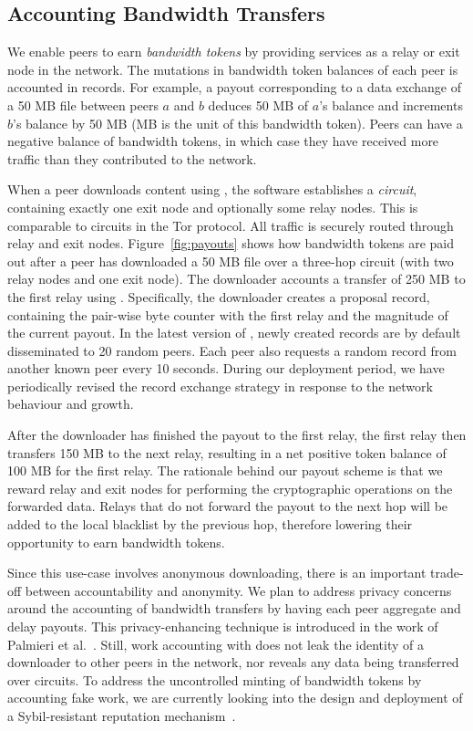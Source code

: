 \subsection{Accounting Bandwidth Transfers}
We enable peers to earn \emph{bandwidth tokens} by providing services as a relay or exit node in the \Tribler{} network.
The mutations in bandwidth token balances of each peer is accounted in \TrustChain{} records.
For example, a payout corresponding to a data exchange of a 50 MB file between peers $ a $ and $ b $ deduces 50 MB of $ a $'s balance and increments $ b $'s balance by 50 MB (MB is the unit of this bandwidth token).
Peers can have a negative balance of bandwidth tokens, in which case they have received more traffic than they contributed to the network.

When a peer downloads content using \Tribler{}, the \Tribler{} software establishes a \emph{circuit}, containing exactly one exit node and optionally some relay nodes.
This is comparable to circuits in the Tor protocol.
All traffic is securely routed through relay and exit nodes.
Figure~\ref{fig:payouts} shows how bandwidth tokens are paid out after a peer has downloaded a 50 MB file over a three-hop circuit (with two relay nodes and one exit node).
The downloader accounts a transfer of 250 MB to the first relay using \TrustChain{}.
Specifically, the downloader creates a proposal record, containing the pair-wise byte counter with the first relay and the magnitude of the current payout.
In the latest version of \Tribler{}, newly created records are by default disseminated to 20 random peers.
Each peer also requests a random record from another known peer every 10 seconds.
During our deployment period, we have periodically revised the record exchange strategy in response to the network behaviour and growth.

After the downloader has finished the payout to the first relay, the first relay then transfers 150 MB to the next relay, resulting in a net positive token balance of 100 MB for the first relay.
The rationale behind our payout scheme is that we reward relay and exit nodes for performing the cryptographic operations on the forwarded data.
Relays that do not forward the payout to the next hop will be added to the local blacklist by the previous hop, therefore lowering their opportunity to earn bandwidth tokens.

Since this use-case involves anonymous downloading, there is an important trade-off between accountability and anonymity.
We plan to address privacy concerns around the accounting of bandwidth transfers by having each peer aggregate and delay payouts.
This privacy-enhancing technique is introduced in the work of Palmieri et al.~\cite{palmieri2015paying}.
Still, work accounting with \TrustChain{} does not leak the identity of a downloader to other peers in the network, nor reveals any data being transferred over circuits.
To address the uncontrolled minting of bandwidth tokens by accounting fake work, we are currently looking into the design and deployment of a Sybil-resistant reputation mechanism~\cite{otte2017trustchain}.

